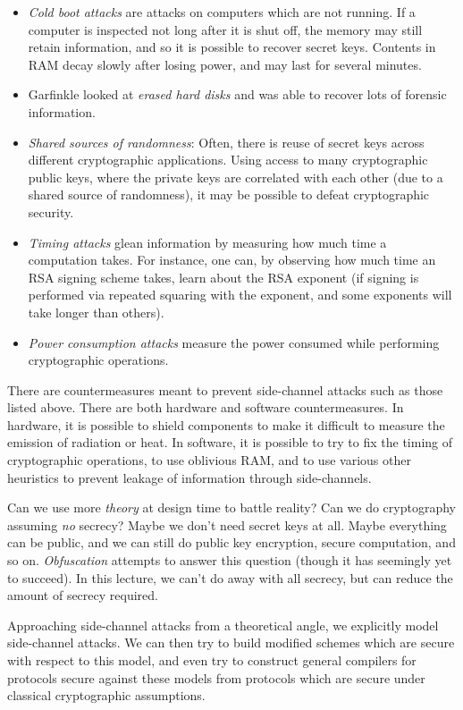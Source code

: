 \documentclass[10pt]{article}
\begin{document}
\begin{itemize}
\item \emph{Cold boot attacks} are attacks on computers which are not running. If a computer is inspected not long after it is shut off, the memory may still retain information, and so it is possible to recover secret keys. Contents in RAM decay slowly after losing power, and may last for several minutes.
\item Garfinkle \cite{garfinkel2003} looked at \emph{erased hard disks} and was able to recover lots of forensic information.
\item \emph{Shared sources of randomness}: Often, there is reuse of secret keys across different cryptographic applications. Using access to many cryptographic public keys, where the private keys are correlated with each other (due to a shared source of randomness), it may be possible to defeat cryptographic security.
\item \emph{Timing attacks} glean information by measuring how much time a computation takes. For instance, one can, by observing how much time an RSA signing scheme takes, learn about the RSA exponent (if signing is performed via repeated squaring with the exponent, and some exponents will take longer than others).
\item \emph{Power consumption attacks} measure the power consumed while performing cryptographic operations.
\end{itemize}

There are countermeasures meant to prevent side-channel attacks such as those listed above. There are both hardware and software countermeasures. In hardware, it is possible to shield components to make it difficult to measure the emission of radiation or heat. In software, it is possible to try to fix the timing of cryptographic operations, to use oblivious RAM, and to use various other heuristics to prevent leakage of information through side-channels.

Can we use more \emph{theory} at design time to battle reality? Can we do cryptography assuming \emph{no} secrecy? Maybe we don't need secret keys at all. Maybe everything can be public, and we can still do public key encryption, secure computation, and so on. \emph{Obfuscation} attempts to answer this question (though it has seemingly yet to succeed). In this lecture, we can't do away with all secrecy, but can reduce the amount of secrecy required.

Approaching side-channel attacks from a theoretical angle, we explicitly model side-channel attacks. We can then try to build modified schemes which are secure with respect to this model, and even try to construct general compilers for protocols secure against these models from protocols which are secure under classical cryptographic assumptions.
\end{document}

